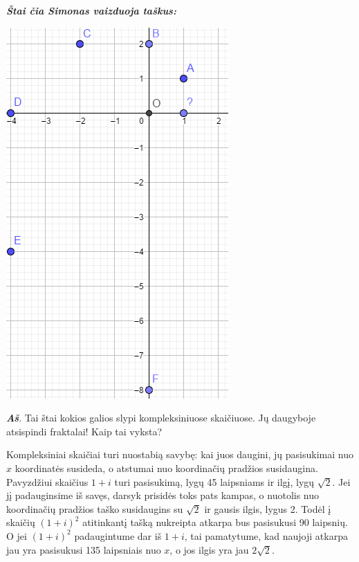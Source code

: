 \documentclass[a4paper]{article}
\newcommand{\say}[1]{\textbf{\textit{#1}}}
\begin{document}
\begin{minipage}[b]{0.3\textwidth}

\say{Štai čia Simonas vaizduoja taškus:}

\includegraphics[width=\textwidth]{sraige.png}
\end{minipage}

\say{Aš}. Tai štai kokios galios slypi kompleksiniuose skaičiuose. Jų daugyboje atsispindi fraktalai! Kaip tai vyksta? 

Kompleksiniai skaičiai turi nuostabią savybę: kai juos daugini, jų pasisukimai nuo $x$ koordinatės susideda, o atstumai nuo koordinačių pradžios susidaugina. Pavyzdžiui skaičius $1+i$ turi pasisukimą, lygų 45 laipsniams ir ilgį, lygų $\sqrt{2}$. Jei jį padauginsime iš savęs, darsyk prisidės toks pats kampas, o nuotolis nuo koordinačių pradžios taško susidaugins su $\sqrt{2}$ ir gausis ilgis, lygus 2. Todėl į skaičių $(1+i)^2$ atitinkantį tašką nukreipta atkarpa bus pasisukusi 90 laipsnių. O jei $(1+i)^2$ padaugintume dar iš $1+i$, tai pamatytume, kad naujoji atkarpa jau yra pasisukusi 135 laipsniais nuo $x$, o jos ilgis yra jau $2\sqrt{2}$.
\end{document}
